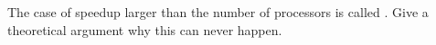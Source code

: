   The case of speedup larger than the number of processors is called
  . Give a theoretical argument why
  this can never happen.
